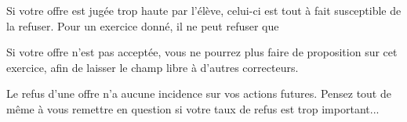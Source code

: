 ﻿Si votre offre est jugée trop haute par l'élève, celui-ci est tout à fait susceptible de la refuser. Pour un exercice donné, il ne peut refuser que %

Si votre offre n'est pas acceptée, vous ne pourrez plus faire de proposition sur cet exercice, afin de laisser le champ libre à d'autres correcteurs.

Le refus d'une offre n'a aucune incidence sur vos actions futures. Pensez tout de même à vous remettre en question si votre taux de refus est trop important...